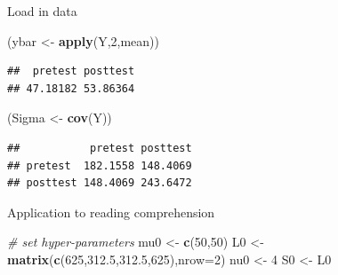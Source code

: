 \documentclass[
  ignorenonframetext,
]{beamer}
\newenvironment{Shaded}{\begin{snugshade}}{\end{snugshade}}
\newcommand{\CommentTok}[1]{\textcolor[rgb]{0.56,0.35,0.01}{\textit{#1}}}
\newcommand{\DataTypeTok}[1]{\textcolor[rgb]{0.13,0.29,0.53}{#1}}
\newcommand{\DecValTok}[1]{\textcolor[rgb]{0.00,0.00,0.81}{#1}}
\newcommand{\FloatTok}[1]{\textcolor[rgb]{0.00,0.00,0.81}{#1}}
\newcommand{\KeywordTok}[1]{\textcolor[rgb]{0.13,0.29,0.53}{\textbf{#1}}}
\newcommand{\NormalTok}[1]{#1}
\newcommand{\StringTok}[1]{\textcolor[rgb]{0.31,0.60,0.02}{#1}}
\begin{document}
\begin{frame}[fragile]{Load in data}
\begin{Shaded}
\begin{Highlighting}[]
\NormalTok{(ybar <-}\StringTok{ }\KeywordTok{apply}\NormalTok{(Y,}\DecValTok{2}\NormalTok{,mean))}
\end{Highlighting}
\end{Shaded}

\begin{verbatim}
##  pretest posttest 
## 47.18182 53.86364
\end{verbatim}

\begin{Shaded}
\begin{Highlighting}[]
\NormalTok{(Sigma <-}\StringTok{ }\KeywordTok{cov}\NormalTok{(Y))}
\end{Highlighting}
\end{Shaded}

\begin{verbatim}
##           pretest posttest
## pretest  182.1558 148.4069
## posttest 148.4069 243.6472
\end{verbatim}

\end{frame}

\begin{frame}[fragile]{Application to reading comprehension}
\protect\hypertarget{application-to-reading-comprehension}{}

\begin{Shaded}
\begin{Highlighting}[]
\CommentTok{# set hyper-parameters}
\NormalTok{mu0 <-}\StringTok{ }\KeywordTok{c}\NormalTok{(}\DecValTok{50}\NormalTok{,}\DecValTok{50}\NormalTok{)}
\NormalTok{L0 <-}\StringTok{ }\KeywordTok{matrix}\NormalTok{(}\KeywordTok{c}\NormalTok{(}\DecValTok{625}\NormalTok{,}\FloatTok{312.5}\NormalTok{,}\FloatTok{312.5}\NormalTok{,}\DecValTok{625}\NormalTok{),}\DataTypeTok{nrow=}\DecValTok{2}\NormalTok{)}
\NormalTok{nu0 <-}\StringTok{ }\DecValTok{4}
\NormalTok{S0 <-}\StringTok{ }\NormalTok{L0}
\end{Highlighting}
\end{Shaded}

\end{frame}
\end{document}
